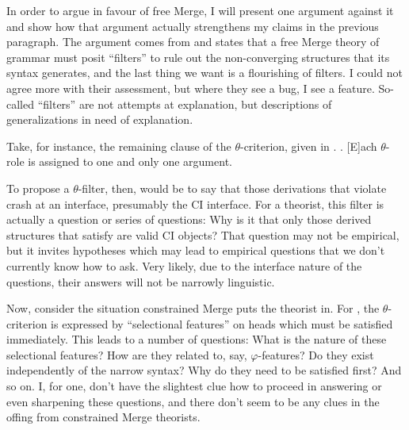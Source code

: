 \documentclass[MilwayThesis]{subfiles}
\begin{document}
In order to argue in favour of free Merge, I will present one argument against it and show how that argument actually strengthens my claims in the previous paragraph.
The argument comes from \textcite{frampton2008crash} and states that a free Merge theory of grammar must posit ``filters'' to rule out the non-converging structures that its syntax generates, and the last thing we want is a flourishing of filters.
I could not agree more with their assessment, but where they see a bug, I see a feature.
So-called ``filters'' are not attempts at explanation, but descriptions of generalizations in need of explanation.

Take, for instance, the remaining clause of the $\theta$-criterion, given in \Next.
\ex. [E]ach $\theta$-role is assigned to one and only one argument. \parencite[36]{chomsky1981lectures}

To propose a $\theta$-filter, then, would be to say that those derivations that violate \Last crash at an interface, presumably the CI interface.
For a theorist, this filter is actually a question or series of questions: Why is it that only those derived structures that satisfy \Last are valid CI objects?
That question may not be empirical, but it invites hypotheses which may lead to empirical questions that we don't currently know how to ask.
Very likely, due to the interface nature of the questions, their answers will not be narrowly linguistic.

Now, consider the situation constrained Merge puts the theorist in.
For \textcite{frampton2008crash}, the $\theta$-criterion is expressed by ``selectional features'' on heads which must be satisfied immediately.
This leads to a number of questions: What is the nature of these selectional features?
How are they related to, say, $\varphi$-features?
Do they exist independently of the narrow syntax?
Why do they need to be satisfied first?
And so on.
I, for one, don't have the slightest clue how to proceed in answering or even sharpening these questions, and there don't seem to be any clues in the offing from constrained Merge theorists.
\end{document}
